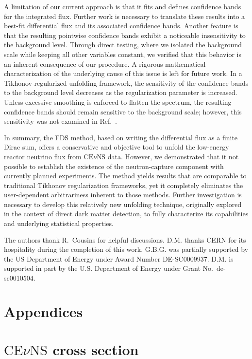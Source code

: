 \documentclass[a4paper,11pt]{article}
\renewcommand\({\left(}
\renewcommand\){\right)}
\renewcommand\[{\left[}
\renewcommand\]{\right]}
\theoremstyle{definition}
\newcommand{\CEnNS}{\text{CE}\nu\text{NS}}
\begin{document}
A limitation of our current approach is that it fits and defines confidence bands for the integrated flux.  Further work is necessary to translate these results into a best-fit differential flux and its associated confidence bands.
Another feature is  that the resulting pointwise confidence bands exhibit a noticeable insensitivity to the background level. Through direct  testing, where we isolated the background scale while keeping all other variables constant, we verified that this behavior is an inherent consequence of our procedure. A rigorous mathematical characterization of the underlying cause of 
this issue is left for future work. 
In a Tikhonov-regularized unfolding framework, the sensitivity of the confidence bands to the background level decreases as the regularization parameter is increased. Unless excessive smoothing is enforced to flatten the spectrum, the resulting confidence bands should remain sensitive to the background scale; however,  this sensitivity was not examined in Ref.~\cite{Liao:2023kyy}.

In summary, the FDS method, based on writing the differential flux as a finite Dirac sum,  offers a conservative and objective tool to unfold the low-energy reactor neutrino flux from $\CEnNS$ data. However, we demonstrated that it not possible to  establish the existence of the neutron-capture component with currently planned experiments. The method yields results that are  comparable to traditional Tikhonov regularization frameworks, yet it completely eliminates the user-dependent arbitrariness inherent to those methods. Further investigation is necessary to develop this relatively new unfolding technique, 
originally explored in the context of direct dark matter detection, to fully characterize its capabilities and underlying statistical properties.


\acknowledgments

The authors thank R.~Cousins for helpful discussions. D.M. thanks CERN for its hospitality during the completion of this work. G.B.G. was partially supported by the US Department of Energy under Award Number DE-SC0009937. D.M. is supported in part by the U.S. Department of Energy under Grant No.~de-sc0010504.

\section*{Appendices}
\appendix
\section{$\CEnNS$ cross section}
\label{AppA:cross-section}
\end{document}

